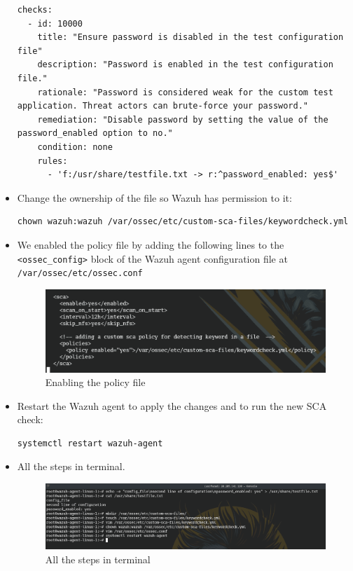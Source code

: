 \begin{itemize}
\begin{verbatim}
checks:
  - id: 10000
    title: "Ensure password is disabled in the test configuration file"
    description: "Password is enabled in the test configuration file."
    rationale: "Password is considered weak for the custom test application. Threat actors can brute-force your password."
    remediation: "Disable password by setting the value of the password_enabled option to no."
    condition: none
    rules:
      - 'f:/usr/share/testfile.txt -> r:^password_enabled: yes$'
        \end{verbatim}

    \item Change the ownership of the file so Wazuh has permission to it:
          \begin{verbatim}
chown wazuh:wazuh /var/ossec/etc/custom-sca-files/keywordcheck.yml
        \end{verbatim}


    \item We enabled the policy file by adding the following lines to the \texttt{<ossec\_config>} block of the Wazuh agent configuration file at \texttt{/var/ossec/etc/ossec.conf}
          \begin{figure} [H]
              \centering
              \includegraphics[width=\textwidth]{images/sca/sca-3.png}
              \caption{Enabling the policy file}
              \label{fig:sca-3}
          \end{figure}

    \item Restart the Wazuh agent to apply the changes and to run the new SCA check:
          \begin{verbatim}
systemctl restart wazuh-agent
        \end{verbatim}

    \item All the steps in terminal.
          \begin{figure} [H]
              \centering
              \includegraphics[width=\textwidth]{images/sca/sca-4.png}
              \caption{All the steps in terminal}
              \label{fig:sca-4}
          \end{figure}

\end{itemize}

